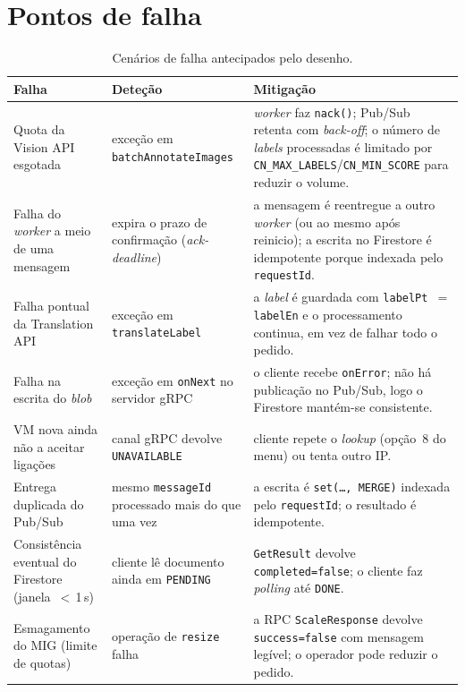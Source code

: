 \documentclass[11pt,a4paper]{article}
\begin{document}
\section{Pontos de falha}
\label{sec:falhas}

\begin{table}[h]
\centering
\small
\begin{tabular}{@{}p{40mm}p{36mm}p{76mm}@{}}
\toprule
Falha & Dete\c{c}\~ao & Mitiga\c{c}\~ao \\
\midrule
Quota da Vision API esgotada & exce\c{c}\~ao em \texttt{batchAnnotateImages} &
\emph{worker} faz \texttt{nack()}; Pub/Sub retenta com \emph{back-off};
o n\'umero de \emph{labels} processadas \'e limitado por
\texttt{CN\_MAX\_LABELS}/\texttt{CN\_MIN\_SCORE} para reduzir o volume. \\

Falha do \emph{worker} a meio de uma mensagem & expira o prazo de
confirma\c{c}\~ao (\emph{ack-deadline}) & a mensagem \'e reentregue a outro
\emph{worker} (ou ao mesmo ap\'os reinicio); a escrita no Firestore \'e
idempotente porque indexada pelo \texttt{requestId}. \\

Falha pontual da Translation API & exce\c{c}\~ao em \texttt{translateLabel} &
a \emph{label} \'e guardada com \texttt{labelPt $=$ labelEn} e o
processamento continua, em vez de falhar todo o pedido. \\

Falha na escrita do \emph{blob} & exce\c{c}\~ao em \texttt{onNext} no servidor
gRPC & o cliente recebe \texttt{onError}; n\~ao h\'a publica\c{c}\~ao no Pub/Sub,
logo o Firestore mant\'em-se consistente. \\

VM nova ainda n\~ao a aceitar liga\c{c}\~oes & canal gRPC devolve
\texttt{UNAVAILABLE} & cliente repete o \emph{lookup} (op\c{c}\~ao~8 do
menu) ou tenta outro IP. \\

Entrega duplicada do Pub/Sub & mesmo \texttt{messageId} processado mais
do que uma vez & a escrita \'e \texttt{set(\dots, MERGE)} indexada pelo
\texttt{requestId}; o resultado \'e idempotente. \\

Consist\^encia eventual do Firestore (janela~$<$\,1\,s) & cliente l\^e
documento ainda em \texttt{PENDING} & \texttt{GetResult} devolve
\texttt{completed=false}; o cliente faz \emph{polling} at\'e
\texttt{DONE}. \\

Esmagamento do MIG (limite de quotas) & opera\c{c}\~ao de \texttt{resize}
falha & a RPC \texttt{ScaleResponse} devolve \texttt{success=false} com
mensagem leg\'ivel; o operador pode reduzir o pedido. \\
\bottomrule
\end{tabular}
\caption{Cen\'arios de falha antecipados pelo desenho.}
\end{table}
\end{document}
